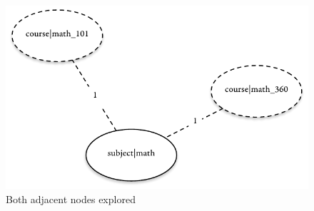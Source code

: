			\begin{figure}
				\centering
				\includegraphics[scale=0.9]{figures/graphs/concurrent/concurrent}
				
				\caption{Both adjacent nodes explored}
				\label{fig:concurrent-concurrent}
			\end{figure}
		

